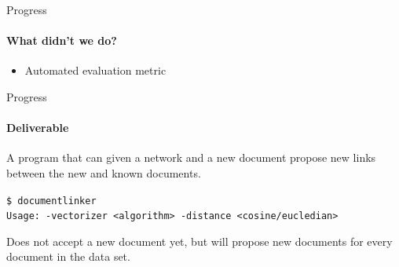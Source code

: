 \begin{frame}[t]{Progress}

\framesubtitle{What didn't we do?}

\begin{itemize}
\item Automated evaluation metric
\end{itemize}

\end{frame}



\begin{frame}[t]{Progress}

\framesubtitle{Deliverable}

A program that can given a network and a new document propose new
links between the new and known documents.

\addvspace{3mm}
{\tt \$ documentlinker\\ Usage: -vectorizer <algorithm> -distance <cosine/eucledian>}

\pause
\addvspace{3mm}
Does not accept a new document yet, but will propose new documents for every
document in the data set.

\end{frame}
